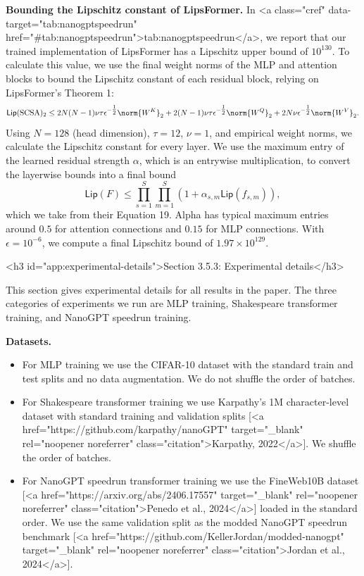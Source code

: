 \textbf{Bounding the Lipschitz constant of LipsFormer.} In <a class="cref" data-target="tab:nanogptspeedrun" href="#tab:nanogptspeedrun">tab:nanogptspeedrun</a>, we report that our trained implementation of LipsFormer has a Lipschitz upper bound of $10^{130}$. To calculate this value, we use the final weight norms of the MLP and attention blocks to bound the Lipschitz constant of each residual block, relying on LipsFormer's Theorem 1:
\[
    \mathsf{Lip}(\text{SCSA})_2 \leq 2N(N-1)\nu\tau\epsilon^{-\tfrac12}\norm{W^K}_2 + 2(N-1)\nu\tau\epsilon^{-\tfrac12}\norm{W^Q}_2 + 2N\nu\epsilon^{-\tfrac12}\norm{W^V}_2.
\]
Using $N = 128$ (head dimension), $\tau = 12$, $\nu = 1$, and empirical weight norms, we calculate the Lipschitz constant for every layer. We use the maximum entry of the learned residual strength $\alpha$, which is an entrywise multiplication, to convert the layerwise bounds into a final bound \[
    \mathsf{Lip}(F) \leq \prod_{s=1}^S \prod_{m=1}^S (1 + \alpha_{s,m} \mathsf{Lip}(f_{s,m})),
\] which we take from their Equation 19. Alpha has typical maximum entries around $0.5$ for attention connections and $0.15$ for MLP connections. With $\epsilon = 10^{-6}$, we compute a final Lipschitz bound of $1.97 \times 10^{129}$.


<h3 id="app:experimental-details">Section 3.5.3: Experimental details</h3>

This section gives experimental details for all results in the paper. The three categories of experiments we run are MLP training, Shakespeare transformer training, and NanoGPT speedrun training.

\textbf{Datasets.}
\begin{itemize}
    \item For MLP training we use the CIFAR-10 dataset \cite{krizhevsky2009cifar} with the standard train and test splits and no data augmentation. We do not shuffle the order of batches.
    \item For Shakespeare transformer training we use Karpathy's 1M character-level dataset with standard training and validation splits [<a href="https://github.com/karpathy/nanoGPT" target="_blank" rel="noopener noreferrer" class="citation">Karpathy, 2022</a>]. We shuffle the order of batches.
    \item For NanoGPT speedrun transformer training we use the FineWeb10B dataset [<a href="https://arxiv.org/abs/2406.17557" target="_blank" rel="noopener noreferrer" class="citation">Penedo et al., 2024</a>] loaded in the standard order. We use the same validation split as the modded NanoGPT speedrun benchmark [<a href="https://github.com/KellerJordan/modded-nanogpt" target="_blank" rel="noopener noreferrer" class="citation">Jordan et al., 2024</a>].
\end{itemize}

